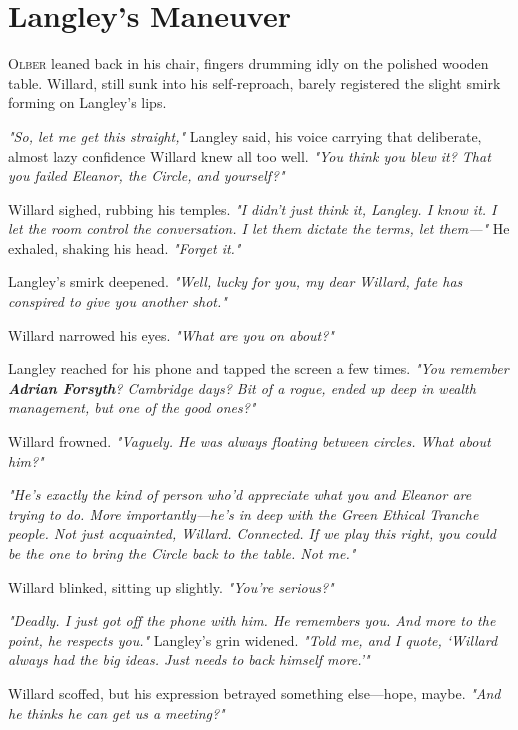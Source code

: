 

\section*{Langley’s Maneuver}

\lettrine{O}{lber} leaned back in his chair, fingers drumming idly on the polished wooden table. Willard, still sunk into his self-reproach, barely registered the slight smirk forming on Langley’s lips. 

\textit{"So, let me get this straight,"} Langley said, his voice carrying that deliberate, almost lazy confidence Willard knew all too well. \textit{"You think you blew it? That you failed Eleanor, the Circle, and yourself?"}

Willard sighed, rubbing his temples. \textit{"I didn’t just think it, Langley. I know it. I let the room control the conversation. I let them dictate the terms, let them—"} He exhaled, shaking his head. \textit{"Forget it."}

Langley’s smirk deepened. \textit{"Well, lucky for you, my dear Willard, fate has conspired to give you another shot."}

Willard narrowed his eyes. \textit{"What are you on about?"}

Langley reached for his phone and tapped the screen a few times. \textit{"You remember \textbf{Adrian Forsyth}? Cambridge days? Bit of a rogue, ended up deep in wealth management, but one of the good ones?"}

Willard frowned. \textit{"Vaguely. He was always floating between circles. What about him?"}

\textit{"He’s exactly the kind of person who’d appreciate what you and Eleanor are trying to do. More importantly—he’s in deep with the Green Ethical Tranche people. Not just acquainted, Willard. Connected. If we play this right, you could be the one to bring the Circle back to the table. Not me."}

Willard blinked, sitting up slightly. \textit{"You’re serious?"}

\textit{"Deadly. I just got off the phone with him. He remembers you. And more to the point, he respects you."} Langley’s grin widened. \textit{"Told me, and I quote, ‘Willard always had the big ideas. Just needs to back himself more.’"} 

Willard scoffed, but his expression betrayed something else—hope, maybe. \textit{"And he thinks he can get us a meeting?"}

